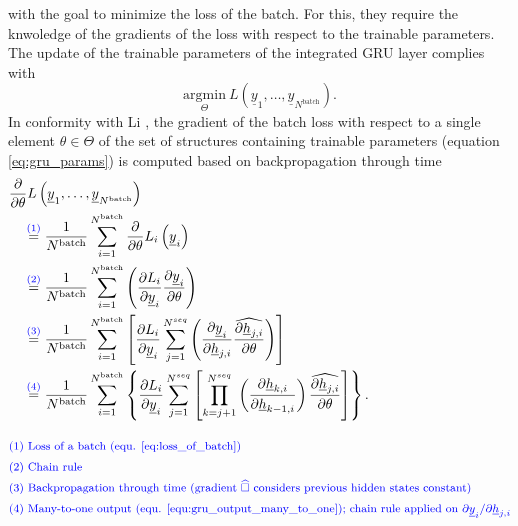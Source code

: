 with the goal to minimize the loss of the batch.
For this, they require the knwoledge of the gradients of the loss 
with respect to the trainable parameters.
The update of the trainable parameters of the integrated GRU layer complies with
\begin{equation}
    \underset{\Theta}{\mathrm{argmin}}\ 
    L\left(\underline y_1, \dots, \underline y_{N^\text{batch}}\right).
\end{equation}
In conformity with Li \cite{li2016tutorial}, the gradient of the batch loss 
with respect to a single element
$\theta \in \Theta$ of the set of structures containing trainable parameters (equation \ref{eq:gru_params})
is computed based on backpropagation through time
\begin{align} \label{eq:gru_grad_loss_2_theta}
    &\frac{\partial}{\partial \theta}
        L\left(\underline y_1, \dots, \underline y_{N^\text{batch}}\right)
    \nonumber \\ & \quad \overset{\textcolor{blue}{(1)}}{=}
    \frac{1}{N^\text{batch}}
    \sum_{i=1}^{N^\text{batch}} 
    \frac{\partial}{\partial \theta}
    L_i \left(\underline y_i\right)
    \nonumber \\ & \quad \overset{\textcolor{blue}{(2)}}{=}
    \frac{1}{N^\text{batch}}
    \sum_{i=1}^{N^\text{batch}} \left(
        \frac{\partial L_i}{\partial \underline y_i}
        \frac{\partial \underline y_i}{\partial \theta}
    \right)
    \nonumber \\ & \quad \overset{\textcolor{blue}{(3)}}{=}
    \frac{1}{N^\text{batch}}
    \sum_{i=1}^{N^\text{batch}} \left[
        \frac{\partial L_i}{\partial \underline y_i}
        \sum_{j=1}^{N^{seq}} \left(
            \frac{\partial  \underline y_i}{\partial \underline h_{j, i}}
            \widehat{ \frac{\partial \underline h_{j, i}}{\partial \theta}}
        \right)
    \right]
    \nonumber \\ & \quad \overset{\textcolor{blue}{(4)}}{=}
    \frac{1}{N^\text{batch}}
    \sum_{i=1}^{N^\text{batch}} \left\{
        \frac{\partial L_i}{\partial \underline y_i}
        \sum_{j=1}^{N^{seq}} \left[
            \prod_{k=j+1}^{N^{seq}} \left(
                \frac{\partial \underline h_{k, i}}{\partial \underline h_{k-1, i}}
            \right)
            \widehat{ \frac{\partial \underline h_{j, i}}{\partial \theta}}
        \right]
    \right\}.
    \\[2ex]
        &\textcolor{blue}{\text{\footnotesize (1) 
            Loss of a batch (equ. \ref{eq:loss_of_batch})}} \nonumber \\
        &\textcolor{blue}{\text{\footnotesize (2) 
            Chain rule}} \nonumber \\
        &\textcolor{blue}{\text{\footnotesize (3) 
            Backpropagation through time (gradient $\widehat{\square}$ considers previous hidden states constant)}} \nonumber \\
        &\textcolor{blue}{\text{\footnotesize (4) 
            Many-to-one output (equ. \ref{equ:gru_output_many_to_one});
            chain rule applied on $\partial \underline y_i / \partial \underline h_{j, i}$}} \nonumber
\end{align}
